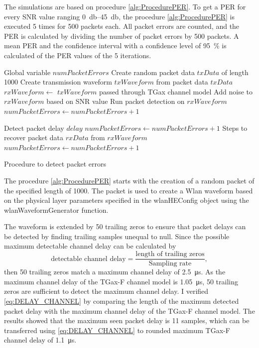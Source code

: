The simulations are based on procedure \autoref{alg:ProcedurePER}.
To get a \ac{PER} for every \ac{SNR} value ranging \SIrange{0}{45}{\decibel}, the procedure \autoref{alg:ProcedurePER} is executed \num{5} times for \num{500} packets each.
All packet errors are counted, and the \ac{PER} is calculated by dividing the number of packet errors by \num{500} packets.
A mean \ac{PER} and the confidence interval with a confidence level of
\SI{95}{\percent} is calculated of the \ac{PER} values of the \num{5} iterations.
\begin{algorithm}
\begin{algorithmic}[1]
\REQUIRE Global variable $numPacketErrors$
\STATE Create random packet data $txData$ of length \SI{1000}{\byte}
\STATE Create transmission waveform $txWaveform$ from packet data $txData$
\STATE $rxWaveform \gets $ $txWaveform$ passed through TGax channel model
\STATE Add noise to $rxWaveform$ based on \ac{SNR} value
\STATE Run packet detection on $rxWaveform$
    \STATE $numPacketErrors \gets numPacketErrors + 1$
\ENDIF

\STATE Detect packet delay $delay$
    \STATE $numPacketErrors \gets numPacketErrors + 1$
\ENDIF
\STATE Steps to recover packet data $rxData$ from $rxWaveform$
    \STATE $numPacketErrors \gets numPacketErrors + 1$
\ENDIF
\end{algorithmic}
\caption{Procedure to detect packet errors}
\label{alg:ProcedurePER}
\end{algorithm}

The procedure \autoref{alg:ProcedurePER} starts with the creation of a random packet of the specified length of \SI{1000}{\byte}.
The packet is used to create a Wlan waveform based on the physical layer parameters specified in the wlanHEConfig object using the wlanWaveformGenerator function.

The waveform is extended by
\num{50} trailing zeros to ensure that packet delays can be detected by finding trailing samples unequal to null.
Since the possible maximum detectable channel delay can be calculated by
\begin{equation}\label{eq:DELAY_CHANNEL}
   \text{detectable channel delay} =
   \frac{
      \text{length of trailing zeros}
   }{
      \text{Sampling rate}
   }
   ,
\end{equation}
then \num{50} trailing zeros match a maximum channel delay of \SI{2.5}{\micro\second}.
As the maximum channel delay of the TGax-F channel model is \SI{1.05}{\micro\second},
\num{50} trailing zeros are sufficient to detect the maximum channel delay.
I verified \autoref{eq:DELAY_CHANNEL} by comparing
the length of the maximum detected packet delay with the maximum channel delay of the TGax-F channel model.
The results showed that the maximum seen packet delay is \num{11} samples,
which can be transferred using \autoref{eq:DELAY_CHANNEL} to rounded maximum TGax-F channel delay of \SI{1.1}{\micro\second}.

